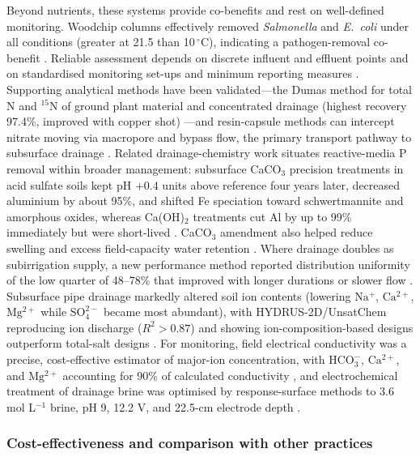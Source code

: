 \documentclass[11pt]{article}
\begin{document}
Beyond nutrients, these systems provide co-benefits and rest on well-defined monitoring. Woodchip columns effectively removed \textit{Salmonella} and \textit{E.\ coli} under all conditions (greater at 21.5 than 10\,$^{\circ}$C), indicating a pathogen-removal co-benefit \parencite{Soupir2018}. Reliable assessment depends on discrete influent and effluent points \parencite{Easton2019} and on standardised monitoring set-ups and minimum reporting measures \parencite{Christianson2021}. Supporting analytical methods have been validated---the Dumas method for total N and $^{15}$N of ground plant material and concentrated drainage (highest recovery 97.4\%, improved with copper shot) \parencite{Schindler1999}---and resin-capsule methods can intercept nitrate moving via macropore and bypass flow, the primary transport pathway to subsurface drainage \parencite{Pampolino2000}. Related drainage-chemistry work situates reactive-media P removal within broader management: subsurface CaCO$_3$ precision treatments in acid sulfate soils kept pH $+0.4$ units above reference four years later, decreased aluminium by about 95\%, and shifted Fe speciation toward schwertmannite and amorphous oxides, whereas Ca(OH)$_2$ treatments cut Al by up to 99\% immediately but were short-lived \parencite{Dalhem2019}. CaCO$_3$ amendment also helped reduce swelling and excess field-capacity water retention \parencite{He2015}. Where drainage doubles as subirrigation supply, a new performance method reported distribution uniformity of the low quarter of 48--78\% that improved with longer durations or slower flow \parencite{Jia2017}. Subsurface pipe drainage markedly altered soil ion contents (lowering $\mathrm{Na^+}$, $\mathrm{Ca^{2+}}$, $\mathrm{Mg^{2+}}$ while $\mathrm{SO_4^{2-}}$ became most abundant), with HYDRUS-2D/UnsatChem reproducing ion discharge ($R^2 > 0.87$) and showing ion-composition-based designs outperform total-salt designs \parencite{Liu2025b}. For monitoring, field electrical conductivity was a precise, cost-effective estimator of major-ion concentration, with $\mathrm{HCO_3^-}$, $\mathrm{Ca^{2+}}$, and $\mathrm{Mg^{2+}}$ accounting for 90\% of calculated conductivity \parencite{Zimmerman2017}, and electrochemical treatment of drainage brine was optimised by response-surface methods to 3.6 mol L$^{-1}$ brine, pH 9, 12.2 V, and 22.5-cm electrode depth \parencite{Yang2023}.

\subsubsection{Cost-effectiveness and comparison with other practices}
\end{document}
